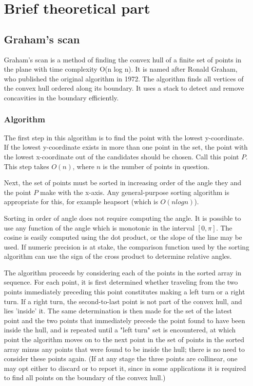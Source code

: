 \documentclass[a4paper,article,14pt]{extarticle}
\begin{document}
	\section{Brief theoretical part}
	\subsection{Graham's scan}
	Graham's scan is a method of finding the convex hull of a finite set of points in the plane with time complexity O(n log n). It is named after Ronald Graham, who published the original algorithm in 1972. The algorithm finds all vertices of the convex hull ordered along its boundary. It uses a stack to detect and remove concavities in the boundary efficiently. 
	
	\subsubsection{Algorithm}
	The first step in this algorithm is to find the point with the lowest y-coordinate. If the lowest y-coordinate exists in more than one point in the set, the point with the lowest x-coordinate out of the candidates should be chosen. Call this point $P$. This step takes $O(n)$, where $n$ is the number of points in question.
	
	Next, the set of points must be sorted in increasing order of the angle they and the point $P$ make with the x-axis. Any general-purpose sorting algorithm is appropriate for this, for example heapsort (which is $O(n log n)$).
	
	Sorting in order of angle does not require computing the angle. It is possible to use any function of the angle which is monotonic in the interval $[0,\pi]$. The cosine is easily computed using the dot product, or the slope of the line may be used. If numeric precision is at stake, the comparison function used by the sorting algorithm can use the sign of the cross product to determine relative angles.
	
	The algorithm proceeds by considering each of the points in the sorted array in sequence. For each point, it is first determined whether traveling from the two points immediately preceding this point constitutes making a left turn or a right turn. If a right turn, the second-to-last point is not part of the convex hull, and lies 'inside' it. The same determination is then made for the set of the latest point and the two points that immediately precede the point found to have been inside the hull, and is repeated until a "left turn" set is encountered, at which point the algorithm moves on to the next point in the set of points in the sorted array minus any points that were found to be inside the hull; there is no need to consider these points again. (If at any stage the three points are collinear, one may opt either to discard or to report it, since in some applications it is required to find all points on the boundary of the convex hull.)
	
\end{document}
